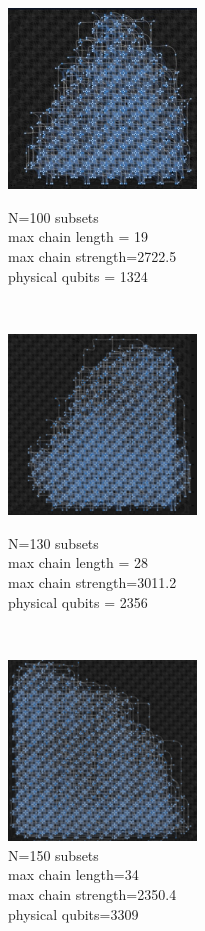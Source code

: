 \documentclass[oneside,a4paper]{article}
\begin{document}
\begin{figure}[htp]
\begin{minipage}[b]{4.5cm}
\includegraphics[width=5cm]{LaTeXTemplate/Images/AdvantageN100.png}
\caption{N=100 subsets\\max chain length = 19\\max chain strength=2722.5\\physical qubits = 1324}
\end{minipage}
\ \hspace{2mm} \hspace{2mm} \
\begin{minipage}[b]{4.5cm}
\centering
\includegraphics[width=5cm]{LaTeXTemplate/Images/AdvantageN130.png}
\caption{N=130 subsets\\max chain length = 28\\max chain strength=3011.2\\physical qubits = 2356}
\end{minipage}
\ \hspace{2mm} \hspace{2mm} \
\begin{minipage}[b]{4.5cm}
\centering
\includegraphics[width=5cm]{LaTeXTemplate/Images/AdvantageN150.png}
\caption{N=150 subsets\\max chain length=34\\max chain strength=2350.4\\physical qubits=3309}
\end{minipage}
\end{figure}
\end{document}
